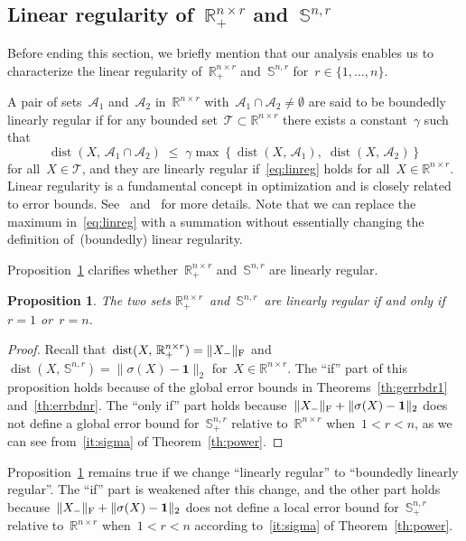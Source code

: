 \documentclass[11pt,a4paper]{article}  %
\newtheorem{proposition}{Proposition}%
\theoremstyle{definition}
\DeclareMathOperator{\dist}{dist}
\newcommand{\RR}{\mathbb{R}}
\renewcommand{\AA}{\mathcal{A}}  %
\newcommand{\TT}{\mathcal{T}}
\newcommand{\col}{r}
\newcommand{\stf}[1]{\mathbb{S}^{#1}}
\newcommand{\fro}{{\scriptstyle{\textnormal{F}}}}
\newcommand{\ones}{\mathbf{1}}
\begin{document}
\subsection{Linear regularity of~$\RR^{n\times \col}_+$ and~$\stf{n,\col}$}
\label{ssec:linreg}

Before ending this section, we briefly mention that our analysis enables us to characterize the
linear regularity of~$\RR^{n\times \col}_+$ and~$\stf{n,\col}$ for~$\col\in\{1, \dots, n\}$.

A pair of sets~$\AA_1$ and~$\AA_2$ in~$\RR^{n\times \col}$ with~$\AA_1\cap\AA_2 \neq
\emptyset$ are said to be boundedly linearly regular if for any bounded
set~$\TT \subset \RR^{n\times \col}$ there exists a constant~$\gamma$ such that%
\begin{equation}
\label{eq:linreg}
\dist(X,\, \AA_1\cap \AA_2) \;\le\; \gamma \max\left\{ \dist(X,\, \AA_1),\; \dist(X,\, \AA_2) \right\}
\end{equation}
for all~$X \in \TT$, and they are linearly regular if~\eqref{eq:linreg} holds for
all~$X\in\RR^{n\times \col}$.
Linear regularity is a fundamental concept in
optimization and is closely related to error bounds. See~\cite{Ng_Yang_2004}
and~\cite[Section~8.5]{Cui_Pang_2021} for more details.
Note that we can replace the maximum in~\eqref{eq:linreg} with a summation without essentially
changing the definition of~(boundedly) linear regularity.

Proposition~\ref{prop:linreg} clarifies whether~$\RR^{n\times \col}_+$ and~$\stf{n,\col}$ are linearly regular.
\begin{proposition}\label{prop:linreg} The two sets
    $\RR^{n\times \col}_+$~and~$\stf{n,\col}$~are linearly regular if and only
    if~$\col = 1$ or~$\col = n$.%
\end{proposition}
\begin{proof}
Recall that~$\dist(X,\,\RR^{n\times\col}_+) = \|X_{-}\|_\fro$
and~$\dist(X,\,\stf{n,\col}) = \|\sigma(X) -\ones\|_2$ for~$X\in\RR^{n\times \col}$.
The ``if'' part of this proposition holds because of the global error bounds in
Theorems~\ref{th:gerrbdr1} and~\ref{th:errbdnr}. The ``only if'' part holds
because~$\|X_{-}\|_\fro + \|\sigma(X) -\ones\|_2$ does not define a global error bound
for~$\stf{n,\col}_+$ relative to~$\RR^{n\times\col}$ when~$1<\col <n$,
as we can see from~\ref{it:sigma} of Theorem~\ref{th:power}.
\end{proof}

Proposition~\ref{prop:linreg} remains true if we change ``linearly regular'' to ``boundedly linearly
regular''. The ``if'' part is weakened after this change, and the other part holds
because~$\|X_{-}\|_\fro + \|\sigma(X) -\ones\|_2$ does not define a local error bound
for~$\stf{n,\col}_+$ relative to~$\RR^{n\times\col}$ when~$1<\col <n$
according to~\ref{it:sigma} of Theorem~\ref{th:power}.
\end{document}

